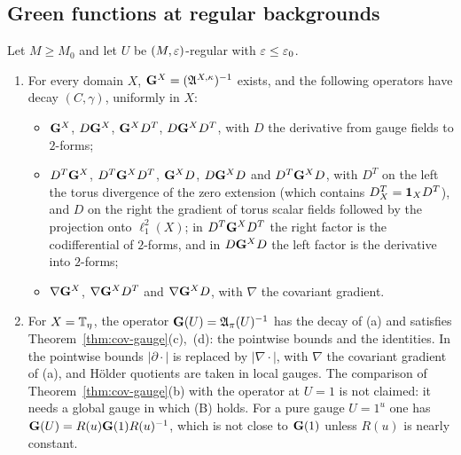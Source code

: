 \subsection{Green functions at regular backgrounds}\label{ss:19.3}

\begin{theorem}\label{thm:reg-gauge}
Let $M\ge M_0$ and let $U$ be $(M,\varepsilon)$-regular with $\varepsilon\le\varepsilon_0$.
\begin{enumerate}[label=(\alph*)]
\item For every domain $X$, $\mathbf G^X=(\mathfrak A^{X,\kappa})^{-1}$ exists, and the following operators have decay $(C,\gamma)$, uniformly in $X$:
  \begin{itemize}
  \item $\mathbf G^X$, $D\mathbf G^X$, $\mathbf G^XD^T$, $D\mathbf G^XD^T$, with $D$ the derivative from gauge fields to $2$-forms;
  \item $D^T\mathbf G^X$, $D^T\mathbf G^XD^T$, $\mathbf G^XD$, $D\mathbf G^XD$ and $D^T\mathbf G^XD$, with $D^T$ on the left the torus divergence of the zero extension (which contains $D^T_X=\mathbf 1_XD^T$), and $D$ on the right the gradient of torus scalar fields followed by the projection onto $\ell^2_1(X)$; in $D^T\mathbf G^XD^T$ the right factor is the codifferential of $2$-forms, and in $D\mathbf G^XD$ the left factor is the derivative into $2$-forms;
  \item $\nabla\mathbf G^X$, $\nabla\mathbf G^XD^T$ and $\nabla\mathbf G^XD$, with $\nabla$ the covariant gradient.
  \end{itemize}
\item For $X=\mathbb T_\eta$, the operator $\mathbf G(U)=\mathfrak A_\pi(U)^{-1}$ has the decay of (a) and satisfies Theorem~\ref{thm:cov-gauge}(c),~(d): the pointwise bounds and the identities. In the pointwise bounds $|\partial\cdot|$ is replaced by $|\nabla\cdot|$, with $\nabla$ the covariant gradient of (a), and H\"older quotients are taken in local gauges. The comparison of Theorem~\ref{thm:cov-gauge}(b) with the operator at $U=1$ is not claimed: it needs a global gauge in which (B) holds. For a pure gauge $U=1^u$ one has $\mathbf G(U)=R(u)\mathbf G(1)R(u)^{-1}$, which is not close to $\mathbf G(1)$ unless $R(u)$ is nearly constant.
\end{enumerate}
\end{theorem}

